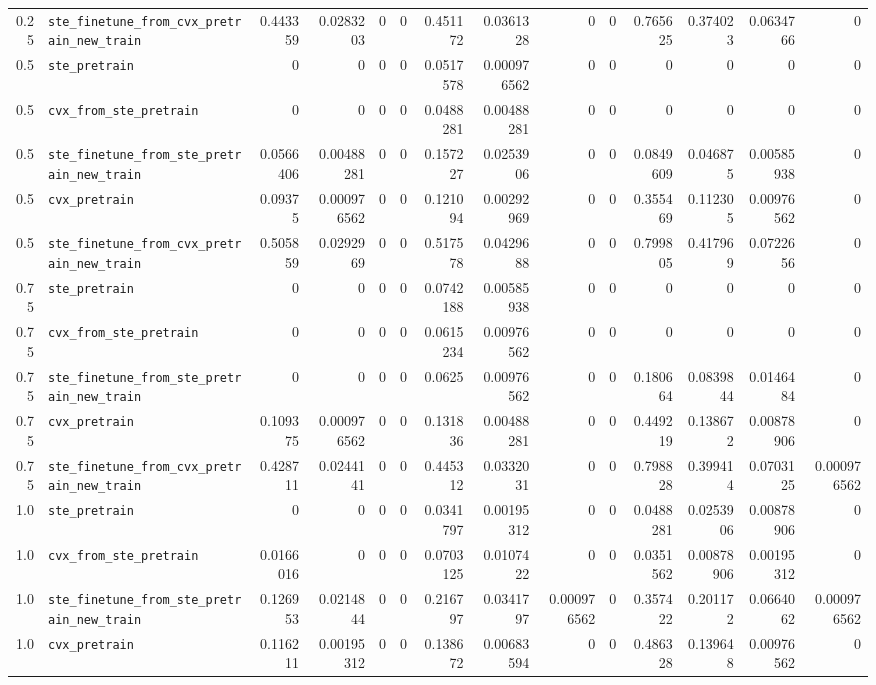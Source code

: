 \begin{longtable}{@{}r l *{12}{r}@{}}
0.25 & \texttt{ste\_finetune\_from\_cvx\_pretrain\_new\_train} & 0.443359 & 0.0283203 & 0 & 0 & 0.451172 & 0.0361328 & 0 & 0 & 0.765625 & 0.374023 & 0.0634766 & 0 \\
0.5 & \texttt{ste\_pretrain} & 0 & 0 & 0 & 0 & 0.0517578 & 0.000976562 & 0 & 0 & 0 & 0 & 0 & 0 \\
0.5 & \texttt{cvx\_from\_ste\_pretrain} & 0 & 0 & 0 & 0 & 0.0488281 & 0.00488281 & 0 & 0 & 0 & 0 & 0 & 0 \\
0.5 & \texttt{ste\_finetune\_from\_ste\_pretrain\_new\_train} & 0.0566406 & 0.00488281 & 0 & 0 & 0.157227 & 0.0253906 & 0 & 0 & 0.0849609 & 0.046875 & 0.00585938 & 0 \\
0.5 & \texttt{cvx\_pretrain} & 0.09375 & 0.000976562 & 0 & 0 & 0.121094 & 0.00292969 & 0 & 0 & 0.355469 & 0.112305 & 0.00976562 & 0 \\
0.5 & \texttt{ste\_finetune\_from\_cvx\_pretrain\_new\_train} & 0.505859 & 0.0292969 & 0 & 0 & 0.517578 & 0.0429688 & 0 & 0 & 0.799805 & 0.417969 & 0.0722656 & 0 \\
0.75 & \texttt{ste\_pretrain} & 0 & 0 & 0 & 0 & 0.0742188 & 0.00585938 & 0 & 0 & 0 & 0 & 0 & 0 \\
0.75 & \texttt{cvx\_from\_ste\_pretrain} & 0 & 0 & 0 & 0 & 0.0615234 & 0.00976562 & 0 & 0 & 0 & 0 & 0 & 0 \\
0.75 & \texttt{ste\_finetune\_from\_ste\_pretrain\_new\_train} & 0 & 0 & 0 & 0 & 0.0625 & 0.00976562 & 0 & 0 & 0.180664 & 0.0839844 & 0.0146484 & 0 \\
0.75 & \texttt{cvx\_pretrain} & 0.109375 & 0.000976562 & 0 & 0 & 0.131836 & 0.00488281 & 0 & 0 & 0.449219 & 0.138672 & 0.00878906 & 0 \\
0.75 & \texttt{ste\_finetune\_from\_cvx\_pretrain\_new\_train} & 0.428711 & 0.0244141 & 0 & 0 & 0.445312 & 0.0332031 & 0 & 0 & 0.798828 & 0.399414 & 0.0703125 & 0.000976562 \\
1.0 & \texttt{ste\_pretrain} & 0 & 0 & 0 & 0 & 0.0341797 & 0.00195312 & 0 & 0 & 0.0488281 & 0.0253906 & 0.00878906 & 0 \\
1.0 & \texttt{cvx\_from\_ste\_pretrain} & 0.0166016 & 0 & 0 & 0 & 0.0703125 & 0.0107422 & 0 & 0 & 0.0351562 & 0.00878906 & 0.00195312 & 0 \\
1.0 & \texttt{ste\_finetune\_from\_ste\_pretrain\_new\_train} & 0.126953 & 0.0214844 & 0 & 0 & 0.216797 & 0.0341797 & 0.000976562 & 0 & 0.357422 & 0.201172 & 0.0664062 & 0.000976562 \\
1.0 & \texttt{cvx\_pretrain} & 0.116211 & 0.00195312 & 0 & 0 & 0.138672 & 0.00683594 & 0 & 0 & 0.486328 & 0.139648 & 0.00976562 & 0 \\

\end{longtable}
